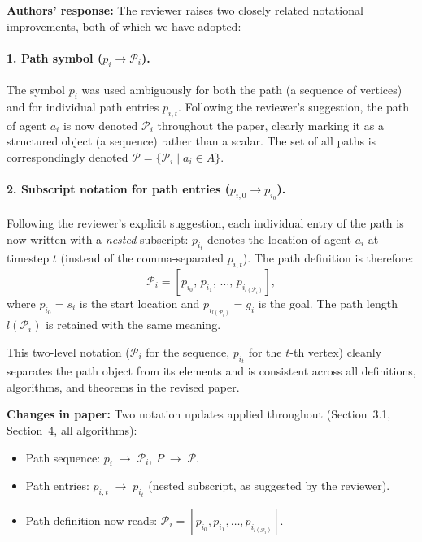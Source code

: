 \documentclass[review]{jair}
\begin{document}
\begin{authorbox}
\textbf{Authors' response:} The reviewer raises two closely related notational improvements, both of which we have adopted:

\paragraph{1. Path symbol ($p_i \to \mathcal{P}_i$).}
The symbol $p_i$ was used ambiguously for both the path (a sequence of vertices) and for individual path entries $p_{i,t}$. Following the reviewer's suggestion, the path of agent $a_i$ is now denoted $\mathcal{P}_i$ throughout the paper, clearly marking it as a structured object (a sequence) rather than a scalar. The set of all paths is correspondingly denoted $\mathcal{P} = \{\mathcal{P}_i \mid a_i \in A\}$.

\paragraph{2. Subscript notation for path entries ($p_{i,0} \to p_{i_0}$).}
Following the reviewer's explicit suggestion, each individual entry of the path is now written with a \emph{nested} subscript: $p_{i_t}$ denotes the location of agent $a_i$ at timestep $t$ (instead of the comma-separated $p_{i,t}$). The path definition is therefore:
\[
\mathcal{P}_i = [p_{i_0},\, p_{i_1},\, \ldots,\, p_{i_{l(\mathcal{P}_i)}}],
\]
where $p_{i_0} = s_i$ is the start location and $p_{i_{l(\mathcal{P}_i)}} = g_i$ is the goal. The path length $l(\mathcal{P}_i)$ is retained with the same meaning.

This two-level notation ($\mathcal{P}_i$ for the sequence, $p_{i_t}$ for the $t$-th vertex) cleanly separates the path object from its elements and is consistent across all definitions, algorithms, and theorems in the revised paper.
\end{authorbox}

\begin{changebox}
\textbf{Changes in paper:} Two notation updates applied throughout (Section~3.1, Section~4, all algorithms):
\begin{itemize}[leftmargin=1.5em]
  \item Path sequence: $p_i \;\to\; \mathcal{P}_i$, \quad $P \;\to\; \mathcal{P}$.
  \item Path entries: $p_{i,t} \;\to\; p_{i_t}$ (nested subscript, as suggested by the reviewer).
  \item Path definition now reads: $\mathcal{P}_i = [p_{i_0}, p_{i_1}, \ldots, p_{i_{l(\mathcal{P}_i)}}]$.
\end{itemize}
\end{changebox}
\end{document}
